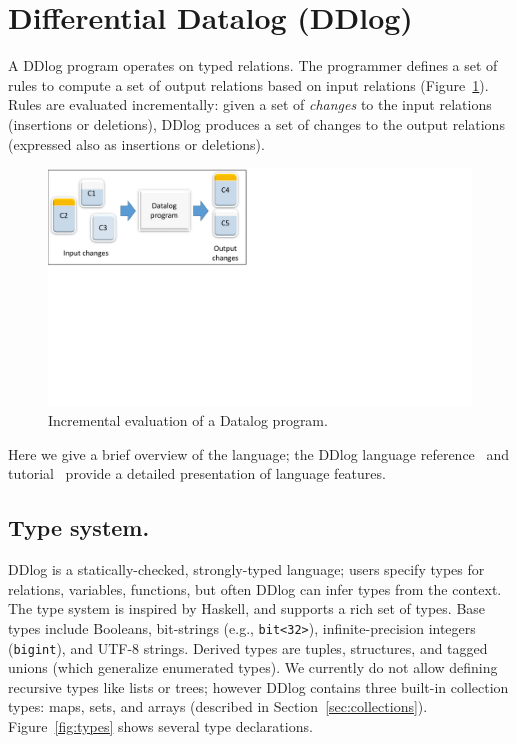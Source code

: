 \section{Differential Datalog (DDlog)}\label{sec-ddlog}

A DDlog program operates on typed relations.  The programmer defines a
set of rules to compute a set of output relations based on input
relations (Figure~\ref{fig:differential}).  Rules are evaluated
incrementally: given a set of \emph{changes} to the input relations
(insertions or deletions), DDlog produces a set of changes to the
output relations (expressed also as insertions or deletions).

\begin{figure}[t]
    \center
    \includegraphics[width=0.5\columnwidth,clip=true,trim=0in 4.4in 6.5in 0in]{differential.pdf}
    \caption{Incremental evaluation of a Datalog program.\label{fig:differential}}
\end{figure}

Here we give a brief overview of the language; the DDlog language
reference~\cite{ddlog-manual} and tutorial~\cite{ddlog-tutorial}
provide a detailed presentation of language features.

\subsection{Type system.}

DDlog is a statically-checked, strongly-typed language; users specify
types for relations, variables, functions, but often DDlog can infer
types from the context.  The type system is inspired by Haskell, and
supports a rich set of types.  Base types include Booleans,
bit-strings (e.g., \texttt{bit<32>}), infinite-precision integers
(\texttt{bigint}), and UTF-8 strings.  Derived types are tuples,
structures, and tagged unions (which generalize enumerated types).  We
currently do not allow defining recursive types like lists or trees; however
DDlog contains three built-in collection types: maps, sets, and arrays
(described in Section~\ref{sec:collections}).  Figure~\ref{fig:types}
shows several type declarations.

